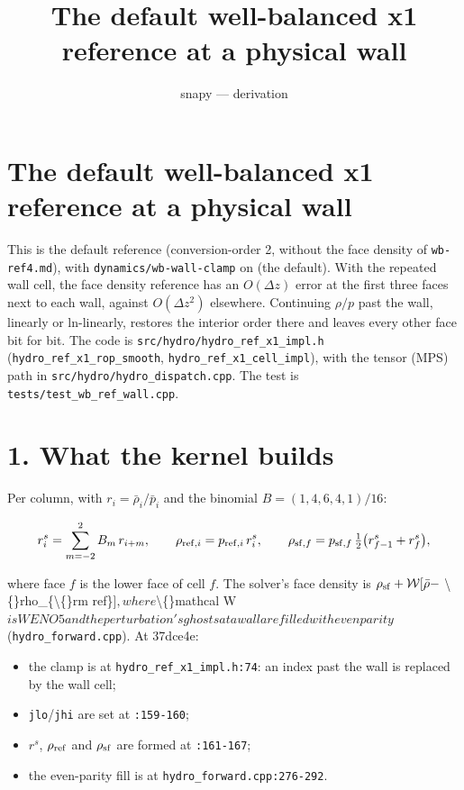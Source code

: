 \documentclass[11pt,a4paper]{article}
\title{The default well-balanced x1 reference at a physical wall}
\author{snapy --- derivation}\date{}
\begin{document}
\maketitle
\section*{The default well-balanced x1 reference at a physical wall}

This is the default reference (conversion-order 2, without the face density of \texttt{wb-ref4.md}), with
\texttt{dynamics/wb-wall-clamp} on (the default). With the
repeated wall cell, the face density reference has an $O(\Delta z)$ error at the first three faces next to each
wall, against $O(\Delta z^2)$ elsewhere. Continuing $\rho/p$ past the wall, linearly or ln-linearly, restores the
interior order there and leaves every other face bit for bit. The code is \texttt{src/hydro/hydro\_ref\_x1\_impl.h}
(\texttt{hydro\_ref\_x1\_rop\_smooth}, \texttt{hydro\_ref\_x1\_cell\_impl}), with the tensor (MPS) path in
\texttt{src/hydro/hydro\_dispatch.cpp}. The test is \texttt{tests/test\_wb\_ref\_wall.cpp}.

\section*{1. What the kernel builds}

Per column, with $r_i = \bar\rho_i/\bar p_i$ and the binomial $B = (1, 4, 6, 4, 1)/16$:

\begin{equation*}
r^s_i = \sum_{m=-2}^{2} B_m\, r_{i+m},\qquad
\rho_{{\rm ref},i} = p_{{\rm ref},i}\, r^s_i,\qquad
\rho_{{\rm sf},f} = p_{{\rm sf},f}\,\tfrac12\big(r^s_{f-1} + r^s_f\big),
\end{equation*}

where face $f$ is the lower face of cell $f$. The solver's face density is $\rho_{\rm sf} + \mathcal W[\bar\rho -$
\textbackslash\{\}rho\_\{\textbackslash\{\}rm ref\}]$, where $\textbackslash\{\}mathcal W$ is WENO5 and the perturbation's ghosts at a wall are filled with even parity$
(\texttt{hydro\_forward.cpp}). At 37dce4e:
\begin{itemize}
\item the clamp is at \texttt{hydro\_ref\_x1\_impl.h:74}: an index past the wall is replaced by the wall cell;
\item \texttt{jlo}/\texttt{jhi} are set at \texttt{:159-160};
\item $r^s$, $\rho_{\rm ref}$ and $\rho_{\rm sf}$ are formed at \texttt{:161-167};
\item the even-parity fill is at \texttt{hydro\_forward.cpp:276-292}.
\end{itemize}
\end{document}
